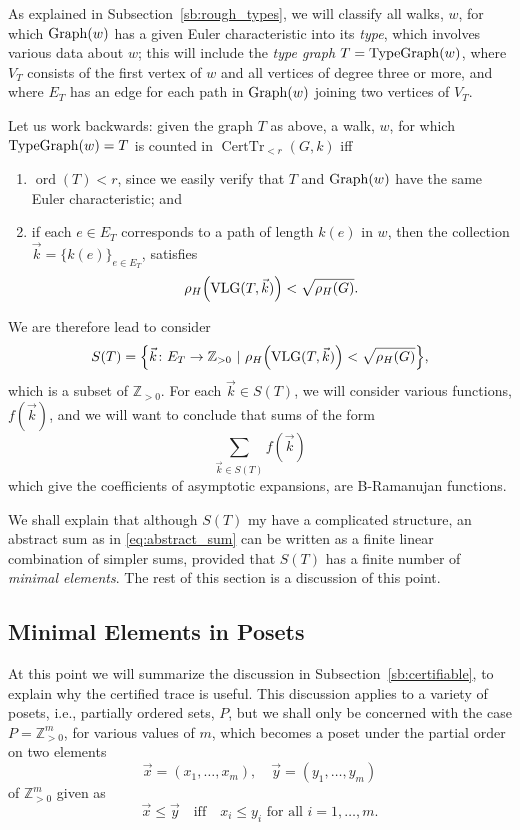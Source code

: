 \documentclass{memo-l}
\theoremstyle{plain}
\theoremstyle{definition}
\numberwithin{section}{chapter}
\numberwithin{equation}{chapter}
\newcommand{\integers}{{\mathbb Z}}
\DeclareMathOperator{\ord}{ord}
\DeclareMathOperator{\CertTr}{CertTr}
\DeclareMathOperator{\VLG}{VLG}
\newcommand{\from}{\colon}
\theoremstyle{plain}
\theoremstyle{definition}
\begin{document}
As explained in Subsection~\ref{sb:rough_types}, we will classify
all walks, $w$, for which ${\rm Graph}(w)$ has a given
Euler characteristic into its {\em \gls{type}}, which involves various
data about $w$; this will include the 
{\em \gls{type graph}} 
$T={\rm TypeGraph}(w)$, where $V_T$
consists of
the first vertex of $w$ and all vertices of degree three or more, and
where $E_T$ has an edge for each path in ${\rm Graph}(w)$ joining
two vertices of $V_T$.

Let us work backwards: given the graph $T$ as above, a walk, $w$,
for which ${\rm TypeGraph}(w)=T$ is counted in $\CertTr_{<r}(G,k)$ iff
\begin{enumerate}
\item $\ord(T)<r$, since we easily verify that $T$ and
${\rm Graph}(w)$ have the same Euler characteristic; and
\item if each $e\in E_T$ corresponds to a path of length
$k(e)$ in $w$, then the collection
$\vec k = \{k(e)\}_{e\in E_T}$, satisfies
$$
\rho_H\Bigl( \VLG(T,\vec k) \Bigr) < \sqrt{\rho_H(G)}.
$$
\end{enumerate}
We are therefore lead to consider
\begin{equation}\label{eq:SofT}
S(T)=\Bigl\{ \vec k\from E_T\to \integers_{>0} \ |\  
\rho_H\Bigl( \VLG(T,\vec k) \Bigr) < \sqrt{\rho_H(G)}
\Bigr\},
\end{equation}
which is a subset of $\integers_{>0}$.  For each $\vec k\in S(T)$, we
will consider various functions, $f(\vec k)$, and we will want to
conclude that sums of the form
\begin{equation}\label{eq:abstract_sum}
\sum_{\vec k\in S(T)} f(\vec k)
\end{equation}
which give the coefficients of 
\glspl{asymptotic expansion},
are 
\glspl{B-Ramanujan function}.

We shall explain that although $S(T)$ my have a complicated structure,
an abstract sum as in \eqref{eq:abstract_sum} can be written as a
finite linear combination of simpler sums, provided that $S(T)$
has a finite number of {\em minimal elements}.
The rest of this section is a discussion of this point.

\subsection{Minimal Elements in Posets}

At this point we will summarize the discussion in
Subsection~\ref{sb:certifiable}, to explain why the certified trace
is useful.  This discussion applies to a variety
of posets, i.e., partially ordered sets, $P$, but we shall only be
concerned with the case $P=\integers_{>0}^m$, for various values of 
$m$, which becomes a poset under the partial order on two elements
$$
\vec x=(x_1,\ldots,x_m),\quad
\vec y=(y_1,\ldots,y_m)
$$
of $\integers_{>0}^m$ given as 
$$
\vec x\le \vec y \quad\mbox{iff}\quad
\mbox{$x_i\le y_i$ for all $i=1,\ldots,m$}.
$$
\end{document}
